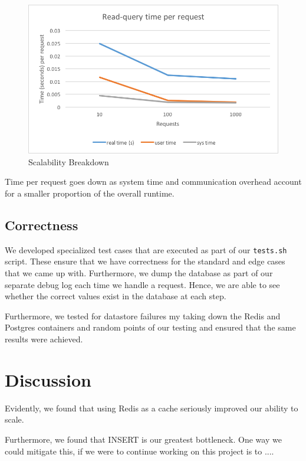 \documentclass[titlepage, 11pt]{article}
\newcommand\0{\mathbf{0}}
\newcommand\<{\langle}
\renewcommand\>{\rangle}
\begin{document}
\begin{figure}[H]
\centering
\includegraphics[width=\linewidth]{read-query-times-per-request.png}
\caption{Scalability Breakdown}
\end{figure}

Time per request goes down as system time and communication overhead account for a smaller proportion of the overall runtime.

\subsection{Correctness}

We developed specialized test cases that are executed as part of our \texttt{tests.sh} script. These ensure that we have correctness for the standard and edge cases that we came up with. Furthermore, we dump the database as part of our separate debug log each time we handle a request. Hence, we are able to see whether the correct values exist in the database at each step.

Furthermore, we tested for datastore failures my taking down the Redis and Postgres containers and random points of our testing and ensured that the same results were achieved.

\section{Discussion}

Evidently, we found that using Redis as a cache seriously improved our ability to scale.

Furthermore, we found that INSERT is our greatest bottleneck. One way we could mitigate this, if we were to continue working on this project is to ....
\end{document}
